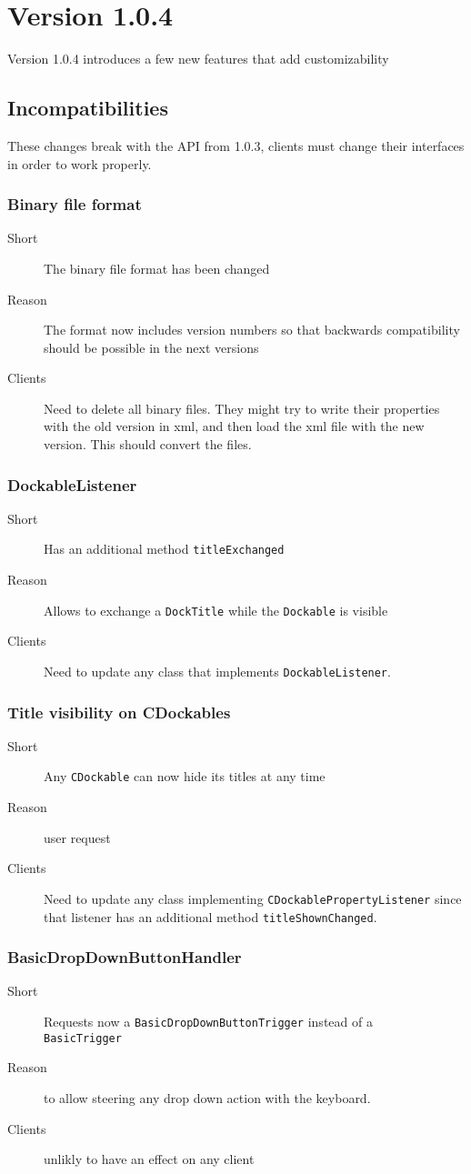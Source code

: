 \documentclass[a4paper,10pt]{article}
\newcommand{\src}[1]{\lstinline[basicstyle=\normalsize\ttfamily,keywordstyle=\normalsize\ttfamily,identifierstyle=\normalsize\ttfamily]|#1|}
\newcommand{\short}{\item[Short]}
\newcommand{\why}{\item[Reason]}
\newcommand{\clients}{\item[Clients]}
\begin{document}
\section{Version 1.0.4}
Version 1.0.4 introduces a few new features that add customizability
\subsection{Incompatibilities}
These changes break with the API from 1.0.3, clients must change their interfaces in order to work properly.

\subsubsection{Binary file format}
\begin{description}
\short The binary file format has been changed
\why The format now includes version numbers so that backwards compatibility should be possible in the next versions
\clients Need to delete all binary files. They might try to write their properties with the old version in xml, and then load the xml file with the new version. This should convert the files.
\end{description}

\subsubsection{DockableListener}
\begin{description}
\short Has an additional method \src{titleExchanged}
\why Allows to exchange a \src{DockTitle} while the \src{Dockable} is visible
\clients Need to update any class that implements \src{DockableListener}.
\end{description}

\subsubsection{Title visibility on CDockables}
\begin{description}
\short Any \src{CDockable} can now hide its titles at any time
\why user request
\clients Need to update any class implementing \src{CDockablePropertyListener} since that listener has an additional method \src{titleShownChanged}.
\end{description}

\subsubsection{BasicDropDownButtonHandler}
\begin{description}
\short Requests now a \src{BasicDropDownButtonTrigger} instead of a \\\src{BasicTrigger}
\why to allow steering any drop down action with the keyboard.
\clients unlikly to have an effect on any client
\end{description}
\end{document}
